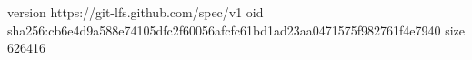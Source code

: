 version https://git-lfs.github.com/spec/v1
oid sha256:cb6e4d9a588e74105dfc2f60056afcfc61bd1ad23aa0471575f982761f4e7940
size 626416
